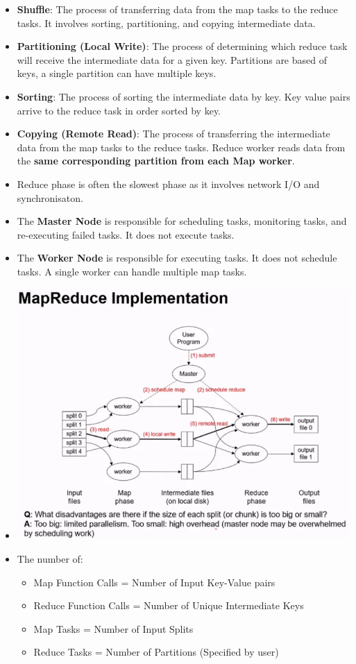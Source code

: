 \documentclass[10pt, landscape]{article}
\begin{document}
\begin{multicols*}{4}
\begin{itemize}
    \item \textbf{Shuffle}: The process of transferring data from the map tasks to the reduce tasks. It involves sorting, partitioning, and copying intermediate data.
    \item \textbf{Partitioning (Local Write)}: The process of determining which reduce task will receive the intermediate data for a given key. Partitions are based of keys, a single partition can have multiple keys.
    \item \textbf{Sorting}: The process of sorting the intermediate data by key. Key value pairs arrive to the reduce task in order sorted by key.
    \item \textbf{Copying (Remote Read)}: The process of transferring the intermediate data from the map tasks to the reduce tasks. Reduce worker reads data from the \textbf{same corresponding partition from each Map worker}.
    \item Reduce phase is often the slowest phase as it involves network I/O and synchronisaton.
    \item The \textbf{Master Node} is responsible for scheduling tasks, monitoring tasks, and re-executing failed tasks. It does not execute tasks.
    \item The \textbf{Worker Node} is responsible for executing tasks. It does not schedule tasks. A single worker can handle multiple map tasks.
    \item \includegraphics[width=0.95\linewidth]{mapreduce_implementation.png}
    \item The number of:
    \begin{itemize}
      \item Map Function Calls = Number of Input Key-Value pairs
      \item Reduce Function Calls = Number of Unique Intermediate Keys
      \item Map Tasks = Number of Input Splits
      \item Reduce Tasks = Number of Partitions (Specified by user)
    \end{itemize}
  \end{itemize}


\end{multicols*}
\end{document}
